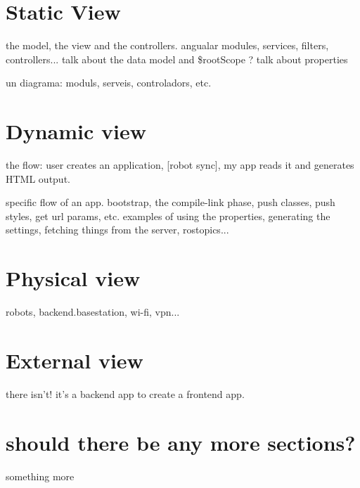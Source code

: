 \section{Static View}
the model, the view and the controllers. angualar modules, services, filters, controllers...
talk about the data model and \$rootScope ? talk about properties

un diagrama:
moduls, serveis, controladors, etc. 

\section{Dynamic view}
the flow: user creates an application, [robot sync], my app reads it and generates HTML output.

specific flow of an app. bootstrap, the compile-link phase, push classes, push styles, get url params, etc.
examples of using the properties, generating the settings, fetching things from the server, rostopics...

\section{Physical view}
robots, backend.basestation, wi-fi, vpn...

\section{External view}
there isn't! it's a backend app to create a frontend app.

\section{should there be any more sections?}
something more
